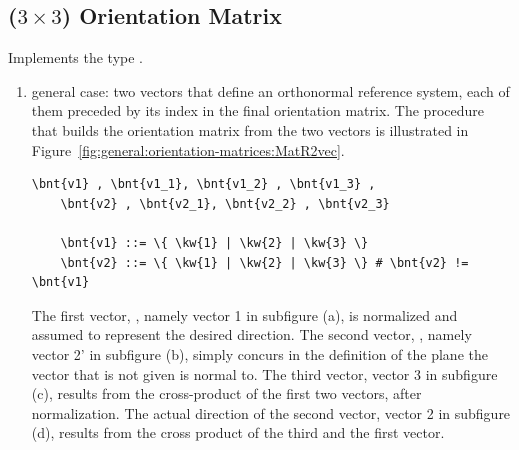 \subsection{($3 \times 3$) Orientation Matrix}
\label{sec:OrientationMatrix}
Implements the type .
\begin{enumerate}
\item general case: two vectors that define an orthonormal reference
system, each of them preceded by its index in the final orientation matrix.
The procedure that builds the orientation matrix from the two vectors
is illustrated in Figure~\ref{fig:general:orientation-matrices:MatR2vec}.
\begin{Verbatim}[commandchars=\\\{\}]
    \bnt{v1} , \bnt{v1_1}, \bnt{v1_2} , \bnt{v1_3} ,
    \bnt{v2} , \bnt{v2_1}, \bnt{v2_2} , \bnt{v2_3}

    \bnt{v1} ::= \{ \kw{1} | \kw{2} | \kw{3} \}
    \bnt{v2} ::= \{ \kw{1} | \kw{2} | \kw{3} \} # \bnt{v2} != \bnt{v1}
\end{Verbatim}
The first vector, , namely vector 1 in subfigure (a), is normalized and assumed
to represent the desired direction.
The second vector, , namely vector 2' in subfigure (b), simply concurs
in the definition of the plane the vector that is not given is normal to.
The third vector, vector 3 in subfigure (c), results from the cross-product
of the first two vectors, after normalization.
The actual direction of the second vector, vector 2 in subfigure (d),
results from the cross product of the third and the first vector.


\end{enumerate}
